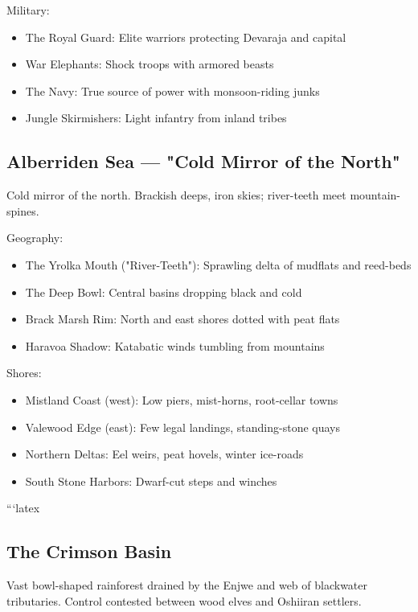 Military:
\begin{itemize}
    \item The Royal Guard: Elite warriors protecting Devaraja and capital
    \item War Elephants: Shock troops with armored beasts
    \item The Navy: True source of power with monsoon-riding junks
    \item Jungle Skirmishers: Light infantry from inland tribes
\end{itemize}

\subsection{Alberriden Sea — "Cold Mirror of the North"}
\label{sec:alberriden}

Cold mirror of the north. Brackish deeps, iron skies; river-teeth meet mountain-spines.

Geography:
\begin{itemize}
    \item The Yrolka Mouth ("River-Teeth"): Sprawling delta of mudflats and reed-beds
    \item The Deep Bowl: Central basins dropping black and cold
    \item Brack Marsh Rim: North and east shores dotted with peat flats
    \item Haravoa Shadow: Katabatic winds tumbling from mountains
\end{itemize}

Shores:
\begin{itemize}
    \item Mistland Coast (west): Low piers, mist-horns, root-cellar towns
    \item Valewood Edge (east): Few legal landings, standing-stone quays
    \item Northern Deltas: Eel weirs, peat hovels, winter ice-roads
    \item South Stone Harbors: Dwarf-cut steps and winches
\end{itemize}

```latex
\subsection{The Crimson Basin}
\label{sec:crimsonbasin}

Vast bowl-shaped rainforest drained by the Enjwe and web of blackwater tributaries. Control contested between wood elves and Oshiiran settlers.

